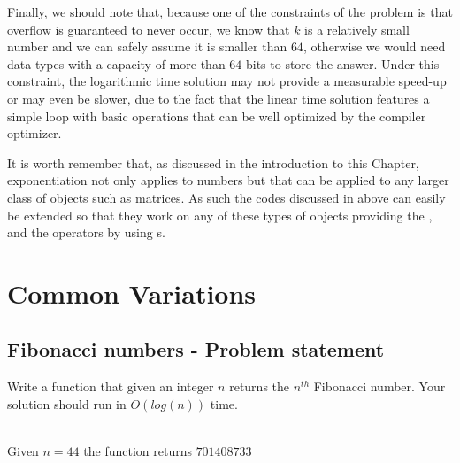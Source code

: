 

Finally, we should note that, because one of the constraints of the problem is that overflow is guaranteed to never occur,  we know that $k$ is a relatively small number and we can safely assume it is smaller than $64$, otherwise we would need data types with a capacity of more than $64$ bits to store the answer.
Under this constraint, the logarithmic time solution may not provide a measurable speed-up or may even be slower, due to the fact that the linear time solution features a simple loop with basic operations that can be well optimized by the compiler optimizer.


It is worth remember that, as discussed in the introduction to this Chapter, exponentiation not only applies to numbers but that can be  applied to any larger class of objects such as matrices. As such the codes discussed in above  can easily be extended so that they work on any of these types of objects  providing the , and the
 operators by using s.


\section{Common Variations}

\subsection{Fibonacci numbers - Problem statement }

\begin{exercise}
Write a function that given an integer $n$ returns the $n^{th}$ Fibonacci number. 
Your solution should run in $O(log(n))$ time. 

    \begin{example}
        \hfill \\
        Given $n=44$ the function returns $701408733$
    \end{example}

\end{exercise}
